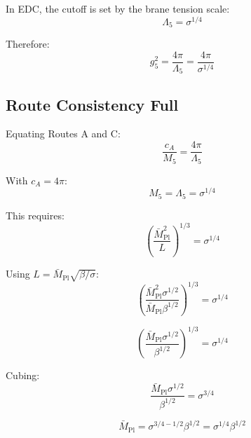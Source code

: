 \documentclass[11pt,a4paper]{article}
\theoremstyle{definition}
\begin{document}
In EDC, the cutoff is set by the brane tension scale:
\begin{equation}
\label{eq:route-c-cutoff}
\Lambda_5 = \sigma^{1/4}
\end{equation}

Therefore:
\begin{equation}
\label{eq:route-c-result}
g_5^2 = \frac{4\pi}{\Lambda_5} = \frac{4\pi}{\sigma^{1/4}}
\end{equation}

\subsection{Route Consistency Full}
\label{subsec:consistency-full}

Equating Routes A and C:
\begin{equation}
\label{eq:consistency-eq}
\frac{c_A}{M_5} = \frac{4\pi}{\Lambda_5}
\end{equation}

With $c_A = 4\pi$:
\begin{equation}
\label{eq:consistency-simp-full}
M_5 = \Lambda_5 = \sigma^{1/4}
\end{equation}

This requires:
\begin{equation}
\label{eq:consistency-req}
\left(\frac{\bar{M}_{\text{Pl}}^2}{L}\right)^{1/3} = \sigma^{1/4}
\end{equation}

Using $L = \bar{M}_{\text{Pl}}\sqrt{\beta/\sigma}$:
\begin{equation}
\label{eq:consistency-expand}
\left(\frac{\bar{M}_{\text{Pl}}^2 \sigma^{1/2}}{\bar{M}_{\text{Pl}} \beta^{1/2}}\right)^{1/3} = \sigma^{1/4}
\end{equation}

\begin{equation}
\label{eq:consistency-simplify}
\left(\frac{\bar{M}_{\text{Pl}} \sigma^{1/2}}{\beta^{1/2}}\right)^{1/3} = \sigma^{1/4}
\end{equation}

Cubing:
\begin{equation}
\label{eq:consistency-cube}
\frac{\bar{M}_{\text{Pl}} \sigma^{1/2}}{\beta^{1/2}} = \sigma^{3/4}
\end{equation}

\begin{equation}
\label{eq:consistency-rearrange}
\bar{M}_{\text{Pl}} = \sigma^{3/4 - 1/2} \beta^{1/2} = \sigma^{1/4} \beta^{1/2}
\end{equation}
\end{document}
